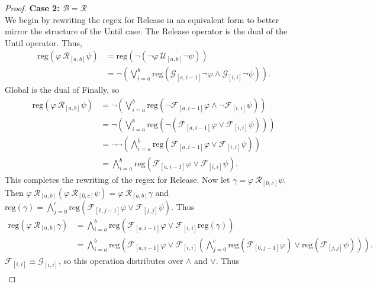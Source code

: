 \documentclass[runningheads]{llncs}
\renewcommand{\phi}{\varphi}
\begin{document}
\begin{proof}
\noindent \textbf{Case 2: $\mathbf{\mathcal{B} = \mathcal{R}}$} \\
We begin by rewriting the regex for Release in an equivalent form to better mirror the structure of the Until case. The Release operator is the dual of the Until operator. Thus,  \\
\begin{align*}
\text{reg}\left(\phi \ \mathcal{R}_{[a,b]}\psi\right) &= \text{reg}\left(\neg\left(\neg\phi \ \mathcal{U}_{[a,b]}\neg\psi\right)\right) \\
&= \neg\left(\bigvee_{i=a}^{b} \text{reg}\left(\mathcal{G}_{[a,i-1]}\neg\phi \land \mathcal{G}_{[i, i]}\neg\psi\right)\right).
\end{align*}
Global is the dual of Finally, so
\begin{align*}
\text{reg}\left(\phi \ \mathcal{R}_{[a,b]}\psi\right) &= \neg\left(\bigvee_{i=a}^{b} \text{reg}\left(\neg\mathcal{F}_{[a,i-1]}\phi \land \neg\mathcal{F}_{[i, i]}\psi\right)\right)\\
&= \neg\left(\bigvee_{i=a}^{b} \text{reg}\left(\neg\left(\mathcal{F}_{[a,i-1]}\phi \lor \mathcal{F}_{[i, i]}\psi\right)\right)\right)\\
&= \neg\neg\left(\bigwedge_{i=a}^{b} \text{reg}\left(\mathcal{F}_{[a,i-1]}\phi \lor \mathcal{F}_{[i, i]}\psi\right)\right)\\
&= \bigwedge_{i=a}^{b} \text{reg}\left(\mathcal{F}_{[a,i-1]}\phi \lor \mathcal{F}_{[i, i]}\psi\right).
\end{align*}
This completes the rewriting of the regex for Release. Now let $\gamma = \phi \ \mathcal{R}_{[0,c]} \psi$. Then $\phi \ \mathcal{R}_{[a,b]}(\phi \ \mathcal{R}_{[0,c]} \psi) = \phi \ \mathcal{R}_{[a,b]}\gamma$ and
$\text{reg}\left(\gamma\right) = \bigwedge_{j=0}^{c} \text{reg}\left(\mathcal{F}_{[0,j-1]}\phi \lor \mathcal{F}_{[j, j]}\psi\right)$. Thus
\begin{align*}
\text{reg}\left(\phi \ \mathcal{R}_{[a,b]}\gamma\right) &= \bigwedge_{i=a}^{b} \text{reg}\left(\mathcal{F}_{[a,i-1]}\phi \lor \mathcal{F}_{[i, i]}\text{reg}\left(\gamma\right)\right)\\
&= \bigwedge_{i=a}^{b} \text{reg}\left(\mathcal{F}_{[a,i-1]}\phi \lor  \mathcal{F}_{[i, i]}\left( \bigwedge_{j=0}^{c} \text{reg}\left(\mathcal{F}_{[0,j-1]}\phi\right) \lor \text{reg}\left(\mathcal{F}_{[j, j]}\psi\right) \right) \right).
\end{align*}
$\mathcal{F}_{[i, i]} \equiv \mathcal{G}_{[i, i]}$, so this operation distributes over $\land$ and $\lor$. Thus
\begin{align*}

\end{align*}
\end{proof}
\end{document}
